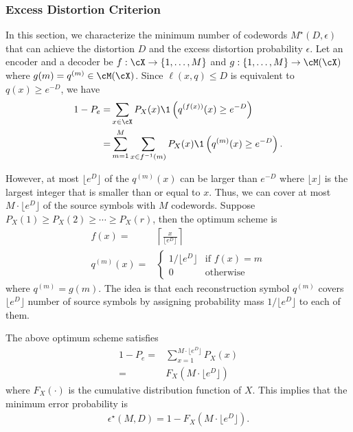 \documentclass[draftclsnofoot, onecolumn, letterpaper, romanappendices]{IEEEtran}
\begin{document}
\subsubsection{Excess Distortion Criterion}
In this section, we characterize the minimum number of codewords $M^\star(D,\epsilon)$
that can achieve the distortion $D$ and the excess distortion probability $\epsilon$.
Let an encoder and a decoder be $f:\cX\rightarrow\{1,\ldots,M\}$
and $g:\{1,\ldots,M\}\rightarrow \cM(\cX)$ where $g(m) = q^{(m)}\in\cM(\cX)$.
Since $\ell(x,q)\leq D$ is equivalent to $q(x)\geq e^{-D}$, we have
\begin{align*}
    1-P_e =& \sum_{x\in\cX} P_X(x) \1\left(q^{(f(x))}(x)\geq e^{-D}\right)\\
    =&\sum_{m=1}^M\sum_{x\in f^{-1}(m)} P_X(x) \1\left(q^{(m)}(x)\geq e^{-D}\right).
\end{align*}

However, at most $\lfloor e^D\rfloor$ of the $q^{(m)}(x)$ can be larger than $e^{-D}$
where $\lfloor x\rfloor$ is the largest integer that is smaller than or equal to $x$.
Thus, we can cover at most $M\cdot \lfloor e^D\rfloor$ of the source symbols
with $M$ codewords. Suppose $P_X(1)\geq P_X(2)\geq \cdots \geq P_X(r)$,
then the optimum scheme is
\begin{align*}
    f(x) =& \left \lceil\frac{x}{\lfloor e^D \rfloor}\right\rceil\\
    q^{(m)}(x) =& \begin{cases}
        1/\lfloor e^D \rfloor &\mbox{if $f(x)=m$}\\
        0&\mbox{otherwise}
    \end{cases}
\end{align*}
where $q^{(m)} = g(m)$.
The idea is that each reconstruction symbol $q^{(m)}$ covers $\lfloor e^D\rfloor$ number of source symbols
by assigning probability mass $1/\lfloor e^D\rfloor$ to each of them.

The above optimum scheme satisfies
\begin{align*}
    1-P_e =& \sum_{x=1}^{M\cdot \lfloor e^D \rfloor} P_X(x)\\
    =& F_X\left(M\cdot \lfloor e^D \rfloor\right)
\end{align*}
where $F_X(\cdot)$ is the cumulative distribution function of $X$.
This implies that the minimum error probability is
\begin{align*}
    \epsilon^{\star}(M,D) = 1-F_X\left(M\cdot \lfloor e^D \rfloor\right).
\end{align*}
\end{document}
